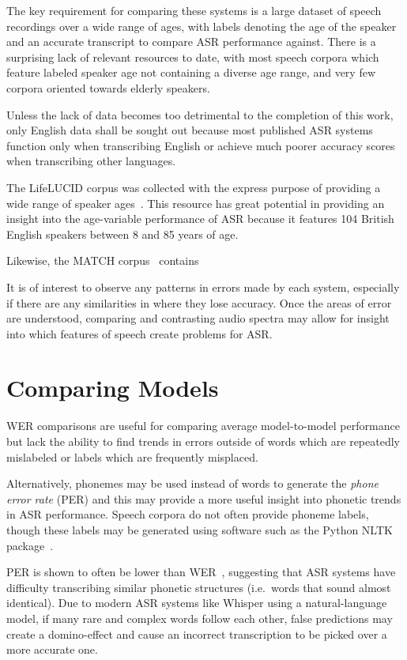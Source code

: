 The key requirement for comparing these systems is a large dataset of speech recordings over a
wide range of ages, with labels denoting the age of the speaker and an accurate transcript to
compare ASR performance against.
There is a surprising lack of relevant resources to date, with most speech corpora which feature
labeled speaker age not containing a diverse age range, and very few corpora oriented towards
elderly speakers.

Unless the lack of data becomes too detrimental to the completion of this work, only English data
shall be sought out because most published ASR systems function only when transcribing English
or achieve much poorer accuracy scores when transcribing other languages.

The LifeLUCID corpus was collected with the express purpose of providing a wide range of
speaker ages~\cite{lifelucid}.
This resource has great potential in providing an insight into the age-variable performance of
ASR because it features 104 British English speakers between 8 and 85 years of age.

Likewise, the MATCH corpus~\cite{Georgila2010Sep} contains

It is of interest to observe any patterns in errors made by each system, especially if there are
any similarities in where they lose accuracy.
Once the areas of error are understood, comparing and contrasting audio spectra may allow for
insight into which features of speech create problems for ASR\@.

\section{Comparing Models}\label{sec:comparing-models}

WER comparisons are useful for comparing average model-to-model performance but lack the ability
to find trends in errors outside of words which are repeatedly mislabeled or labels which are
frequently misplaced.

Alternatively, phonemes may be used instead of words to generate the \emph{phone error rate}
(PER) and this may provide a more useful insight into phonetic trends in ASR performance.
Speech corpora do not often provide phoneme labels, though these labels may be generated using
software such as the Python NLTK package~\cite{nltk}.

PER is shown to often be lower than WER~\cite{fang2020}, suggesting that ASR systems have
difficulty transcribing similar phonetic structures (i.e.\ words that sound almost identical).
Due to modern ASR systems like Whisper using a natural-language model, if many rare and complex
words follow each other, false predictions may create a domino-effect and cause an incorrect
transcription to be picked over a more accurate one.

